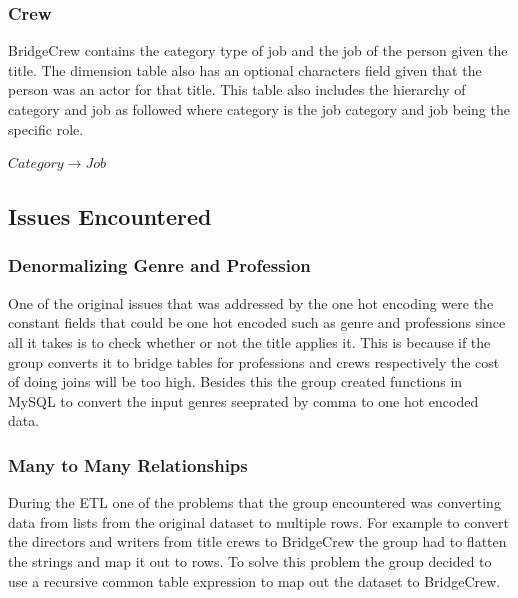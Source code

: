 \subsubsection{Crew}
BridgeCrew contains the category type of job and the job of the person given the title. The dimension table also has an optional characters field given that the person was an actor for that title. This table also includes the hierarchy of category and job as followed where category is the job category and job being the specific role.
\begin{center}
	$Category \rightarrow Job$
\end{center}

\subsection{Issues Encountered}
\subsubsection{Denormalizing Genre and Profession}
One of the original issues that was addressed by the one hot encoding were the constant fields that could be one hot encoded such as genre and professions since all it takes is to check whether or not the title applies it. This is because if the group converts it to bridge tables for professions and crews respectively the cost of doing joins will be too high. Besides this the group created functions in MySQL to convert the input genres seeprated by comma to one hot encoded data. 
\newline

\subsubsection{Many to Many Relationships}
During the ETL one of the problems that the group encountered was converting data from lists from the original dataset to multiple rows. For example to convert the directors and writers from title crews to BridgeCrew the group had to flatten the strings and map it out to rows. To solve this problem the group decided to use a recursive common table expression to map out the dataset to BridgeCrew. 
\newline



